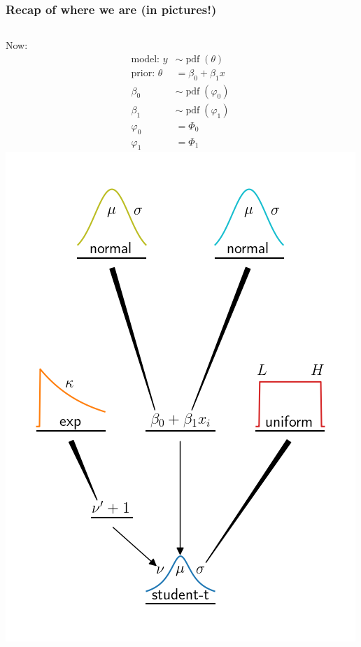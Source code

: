 \documentclass[usenames,dvipsnames,table]{beamer}
\begin{document}
\begin{frame}
\frametitle{Recap of where we are (in pictures!)}
\begin{columns}
Now:
\begin{align*}
\textrm{model: } y      &\sim \operatorname{pdf}(\theta) \\
\textrm{prior: } \theta &= \beta_0 + \beta_1 x \\
                   \beta_0 &\sim \operatorname{pdf}(\varphi_0) \\
                   \beta_1 &\sim \operatorname{pdf}(\varphi_1) \\
                   \varphi_0 &= \Phi_0 \\
                   \varphi_1 &= \Phi_1
\end{align*}
\includegraphics[width=\textwidth]{img/progress-regression}
\end{columns}
\end{frame}
\end{document}

